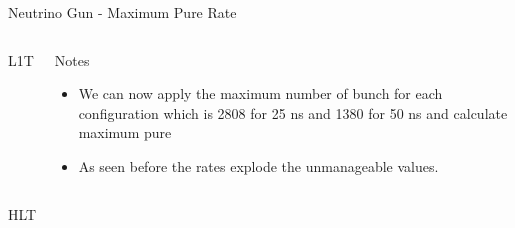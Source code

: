 \documentclass[8pt]{beamer}
\begin{document}
\begin{frame}{Neutrino Gun - Maximum Pure Rate}



\begin{columns}

\begin{block}{L1T}
\centering

\resizebox{1.0\linewidth}{!}{

}

\end{block}

\begin{block}{Notes}
 
\begin{itemize}
  \item We can now apply the maximum number of bunch for each configuration which is 2808 for 25 ns and 1380 for 50 ns and calculate maximum pure 
  \item As seen before the rates explode the unmanageable values.
\end{itemize}
 
\end{block}

\end{columns}

\begin{block}{HLT}
\centering

\resizebox{0.8\linewidth}{!}{}

\end{block}

\end{frame}
\end{document}
